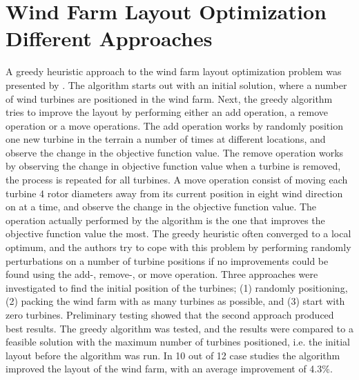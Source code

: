\section{Wind Farm Layout Optimization Different Approaches}\label{section:relatedworkother}


A greedy heuristic approach to the wind farm layout optimization problem was presented by \cite{Ozturk}. The algorithm starts out with an initial solution, where a number of wind turbines are positioned in the wind farm. Next, the greedy algorithm tries to improve the layout by performing either an add operation, a remove operation or a move operations. The add operation works by randomly position one new turbine in the terrain a number of times at different locations, and observe the change in the objective function value. The remove operation works by observing the change in objective function value when a turbine is removed, the process is repeated for all turbines. A move operation consist of moving each turbine 4 rotor diameters away from its current position in eight wind direction on at a time, and observe the change in the objective function value. The operation actually performed by the algorithm is the one that improves the objective function value the most. The greedy heuristic often converged to a local optimum, and the authors try to cope with this problem by performing randomly perturbations on a number of turbine positions if no improvements could be found using the add-, remove-, or move operation. Three approaches were investigated to find the initial position of the turbines; (1) randomly positioning, (2) packing the wind farm with as many turbines as possible, and (3) start with zero turbines. Preliminary testing showed that the second approach produced best results. The greedy algorithm was tested, and the results were compared to a feasible solution with the maximum number of turbines positioned, i.e. the initial layout before the algorithm was run. In 10 out of 12 case studies the algorithm improved the layout of the wind farm, with an average improvement of 4.3\%. \\


